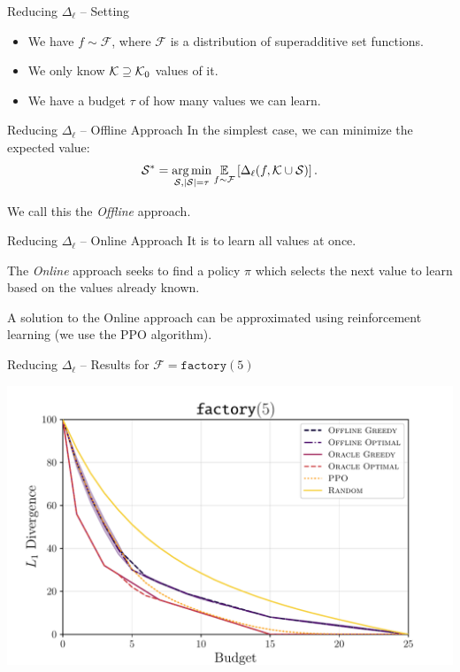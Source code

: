 \documentclass[aspectratio=169]{beamer}
\def\s{\mathcal{S}}
\begin{document}
\begin{frame}{Reducing $ \Delta_\ell $ -- Setting}
	\begin{itemize}[ ]
		\item<2-> We have \alert<2>{$ f \sim \mathcal{F} $}, where $ \mathcal{F} $ is a distribution of superadditive set functions.
		\item<3-> We only \alert<3>{know $ \mathcal{K} \supseteq \mathcal{K}_0 $} values of it.
		\item<4-> We have a \alert<4>{budget $ \tau $} of how many values we can learn.
	\end{itemize}
\end{frame}

\begin{frame}{Reducing $ \Delta_\ell $ -- Offline Approach}
	In the simplest case, we can \alert{minimize the expected value}: \[
		\s^* = \argmin_{\s, \absolute{\s} = \tau} \E_{f \sim \mathcal{F}} \left[ \Delta_\ell(f,\k \cup \s) \right].
	\]

	\vspace{2em}
	We call this the \emph{Offline} approach.
\end{frame}

\begin{frame}{Reducing $ \Delta_\ell $ -- Online Approach}
	It is  to learn all values at once.

	The \emph{Online} approach seeks to find a policy $ \pi $ which selects the next value to learn based on the values already known.

	A solution to the Online approach can be approximated using reinforcement learning (we use the PPO algorithm).
\end{frame}

\begin{frame}{Reducing $ \Delta_\ell $ -- Results for $ \mathcal{F} = \texttt{factory} (5) $}
	\begin{center}
		\includegraphics[width=.8\textwidth]{figures/l1_norm_predictible_factory5.pdf}
	\end{center}
\end{frame}
\end{document}
